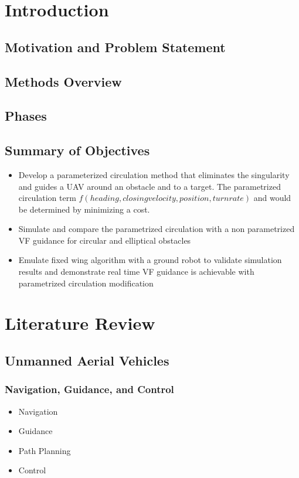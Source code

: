 \documentclass[numbered,pdftex]{ohio-etd}
\begin{document}
\chapter{Introduction}
\section{Motivation and Problem Statement}
\section{Methods Overview}
\section{Phases}
\section{Summary of Objectives}
\begin{itemize}

\item Develop a parameterized circulation method that eliminates the singularity and guides a UAV around an obstacle and to a target. The parametrized circulation term $f(heading,closing velocity, position, turn rate)$ and would be determined by minimizing a cost.


\item Simulate and compare the parametrized circulation with a non parametrized VF guidance for circular and elliptical obstacles

\item Emulate fixed wing algorithm with a ground robot to validate simulation results and demonstrate real time VF guidance is achievable with parametrized circulation modification
\end{itemize}


\chapter{Literature Review}
\section{Unmanned Aerial Vehicles}
\subsection{Navigation, Guidance, and Control}
\begin{itemize}
\item Navigation
\item Guidance
\item Path Planning
\item Control
\end{itemize}
\end{document}
